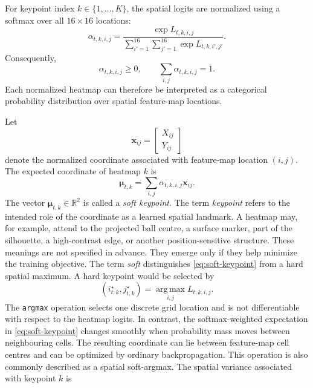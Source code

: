 \documentclass[11pt,a4paper]{article}
\begin{document}
For keypoint index $k\in\{1,\ldots,K\}$, the spatial logits are normalized using a softmax over all $16\times16$ locations: \begin{equation} 
	\alpha_{t,k,i,j} = \frac{ \exp L_{t,k,i,j} }{ \displaystyle \sum_{i'=1}^{16} \sum_{j'=1}^{16} \exp L_{t,k,i',j'} }. \label{eq:keypoint-softmax} 
\end{equation} 
Consequently, 
\begin{equation} 
	\alpha_{t,k,i,j}\geq0, \qquad \sum_{i,j}\alpha_{t,k,i,j}=1. 
\end{equation} 
Each normalized heatmap can therefore be interpreted as a categorical probability distribution over spatial feature-map locations. 

Let 
\begin{equation} 
	\mathbf x_{ij} = \begin{bmatrix} X_{ij}\\ Y_{ij} \end{bmatrix} 
\end{equation} denote the normalized coordinate associated with feature-map location $(i,j)$. The expected coordinate of heatmap $k$ is 
\begin{equation} 
	\boldsymbol{\mu}_{t,k} = \sum_{i,j} \alpha_{t,k,i,j}\mathbf x_{ij}. \label{eq:soft-keypoint} 
\end{equation}
The vector $\boldsymbol{\mu}_{t,k}\in\mathbb{R}^2$ is called a \emph{soft keypoint}. 
The term \emph{keypoint} refers to the intended role of the coordinate as a learned spatial landmark. A heatmap may, for example, attend to the projected ball centre, a surface marker, part of the silhouette, a high-contrast edge, or another position-sensitive structure. These meanings are not specified in advance. They emerge only if they help minimize the training objective. The term \emph{soft} distinguishes \eqref{eq:soft-keypoint} from a hard spatial maximum. A hard keypoint would be selected by 
\begin{equation} 
	(i^\star_{t,k},j^\star_{t,k}) = \operatorname*{arg\,max}_{i,j} L_{t,k,i,j}. 
\end{equation} 
The \texttt{argmax} operation selects one discrete grid location and is not differentiable with respect to the heatmap logits. In contrast, the softmax-weighted expectation in \eqref{eq:soft-keypoint} changes smoothly when probability mass moves between neighbouring cells. The resulting coordinate can lie between feature-map cell centres and can be optimized by ordinary backpropagation. This operation is also commonly described as a spatial soft-argmax. The spatial variance associated with keypoint $k$ is 
\end{document}
